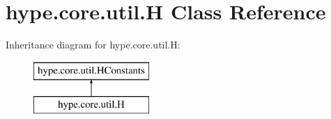 \hypertarget{classhype_1_1core_1_1util_1_1_h}{\section{hype.\-core.\-util.\-H Class Reference}
\label{classhype_1_1core_1_1util_1_1_h}
}
Inheritance diagram for hype.\-core.\-util.\-H\-:\begin{figure}[H]
\begin{center}
\leavevmode
\includegraphics[height=2.000000cm]{classhype_1_1core_1_1util_1_1_h}
\end{center}
\end{figure}
